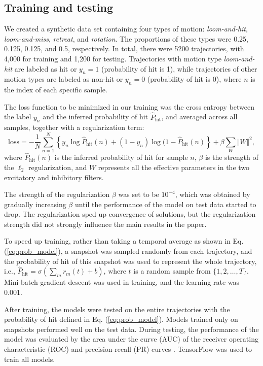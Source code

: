 \documentclass[pdftex,9pt,lineno]{elife}
\let\hat\widehat
\begin{document}
\subsection{Training and testing}
We created a synthetic data set containing four types of motion: \emph{loom-and-hit}, \emph{loom-and-miss}, \emph{retreat}, and \emph{rotation}. The proportions of these types were 0.25, 0.125, 0.125, and 0.5, respectively. In total, there were 5200 trajectories, with 4,000 for training and 1,200 for testing. Trajectories with motion type \emph{loom-and-hit} are labeled as hit or $y_{n}=1$ (probability of hit is 1), while trajectories of other motion types are labeled as non-hit or $y_{n}=0$ (probability of hit is 0), where $n$ is the index of each specific sample.

The loss function to be minimized in our training was the cross entropy between the label $y_{n}$ and the inferred probability of hit $\hat{P}_{\text{hit}}$, and averaged across all samples, together with a regularization term:
\begin{equation}
\text{loss}=-\frac{1}{N}\sum_{n=1}^{N}\left\{ y_{n}\log \hat{P}_{\text{hit}}(n)+(1-y_{n})\log (1-\hat{P}_{\text{hit}}(n) \right\}+\beta\sum_{W}\Vert W \Vert^{2},
\end{equation}
where $\hat{P}_{\text{hit}}(n)$ is the inferred probability of hit for sample $n$, $\beta$ is the strength of the $\ell_2$ regularization, and $W$ represents all the effective parameters in the two excitatory and inhibitory filters.

The strength of the regularization $\beta$ was set to be $10^{-4}$, which was obtained by gradually increasing $\beta$ until the performance of the model on test data started to drop. The regularization sped up convergence of solutions, but the regularization strength did not strongly influence the main results in the paper.

To speed up training, rather than taking a temporal average as shown in Eq. (\ref{eq:prob_model}), a snapshot was sampled randomly from each trajectory, and the probability of hit of this snapshot was used to represent the whole trajectory, i.e., $\hat{P}_{\text{hit}}=\sigma \left( \sum_{m}r_{m}(t)+b \right)$, where $t$ is a random sample from $\{1,2,\dots,T\}$. Mini-batch gradient descent was used in training, and the learning rate was 0.001.

After training, the models were tested on the entire trajectories with the probability of hit defined in Eq. (\ref{eq:prob_model}). Models trained only on snapshots performed well on the test data. During testing, the performance of the model was evaluated by the area under the curve (AUC) of the receiver operating characteristic (ROC) and precision-recall (PR) curves \citep{hanley1982meaning,davis2006relationship}.
TensorFlow \citep{abadi2016tensorflow} was used to train all models.
\end{document}
